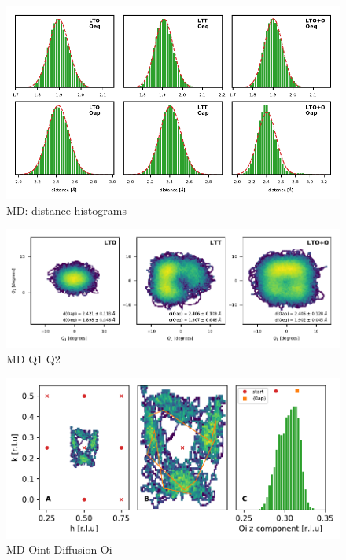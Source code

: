 \begin{figure}
	\centering
	\includegraphics[width=\textwidth]{fig/simulation/dist_hist.pdf}
	\caption[MD: distance histograms]{MD: distance histograms}
	\label{fig:md_distances}
\end{figure}

\begin{figure}
	\centering
	\includegraphics[width=\textwidth]{fig/simulation/prm_q1q2.pdf}
	\caption[MD Q1 Q2]{MD Q1 Q2}
	\label{fig:md_q1_q2}
\end{figure}

\begin{figure}
	\centering
	\includegraphics[width=\textwidth]{fig/simulation/diffusion1.pdf}
	\caption[MD Oint Diffusion Oi]{MD Oint Diffusion Oi}
	\label{fig:md_diffusion1}
\end{figure}

